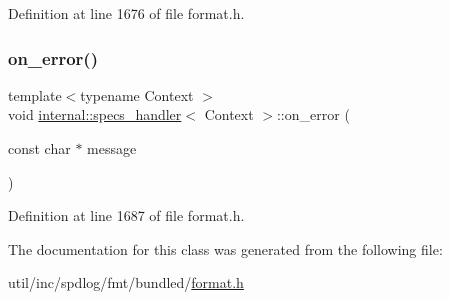 Definition at line 1676 of file format.\+h.

\mbox{\label{classinternal_1_1specs__handler_a7d55879a00c71c833714b357c6a0bd78}} 
\subsubsection{\texorpdfstring{on\+\_\+error()}{on\_error()}}
{\footnotesize\ttfamily template$<$typename Context $>$ \\
void \hyperlink{classinternal_1_1specs__handler}{internal\+::specs\+\_\+handler}$<$ Context $>$\+::on\+\_\+error (\begin{DoxyParamCaption}\item[{const char $\ast$}]{message }\end{DoxyParamCaption})\hspace{0.3cm}{\ttfamily [inline]}}



Definition at line 1687 of file format.\+h.



The documentation for this class was generated from the following file\+:\begin{DoxyCompactItemize}
\item 
util/inc/spdlog/fmt/bundled/\hyperlink{format_8h}{format.\+h}\end{DoxyCompactItemize}
